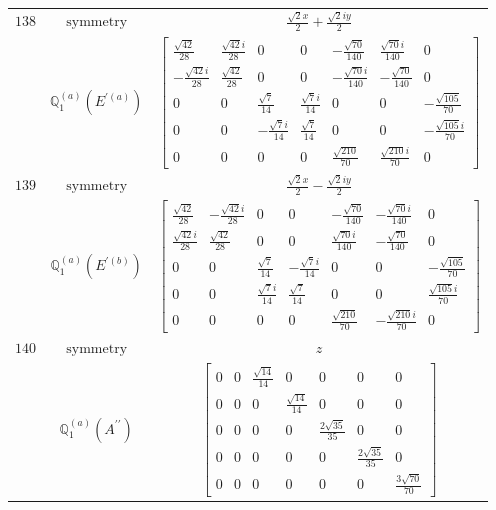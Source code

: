 \documentclass[fleqn,8pt,landscape]{jsarticle}
\begin{document}
\begin{longtable}{ccc}
$ 138 $ & $ \text{symmetry} $ & $ \frac{\sqrt{2} x}{2} + \frac{\sqrt{2} i y}{2} $ \\
$  $ & $ \mathbb{Q}_{1}^{(a)}(E^{\prime(a)}) $ & $ \begin{bmatrix} \frac{\sqrt{42}}{28} & \frac{\sqrt{42} i}{28} & 0 & 0 & - \frac{\sqrt{70}}{140} & \frac{\sqrt{70} i}{140} & 0 \\ - \frac{\sqrt{42} i}{28} & \frac{\sqrt{42}}{28} & 0 & 0 & - \frac{\sqrt{70} i}{140} & - \frac{\sqrt{70}}{140} & 0 \\ 0 & 0 & \frac{\sqrt{7}}{14} & \frac{\sqrt{7} i}{14} & 0 & 0 & - \frac{\sqrt{105}}{70} \\ 0 & 0 & - \frac{\sqrt{7} i}{14} & \frac{\sqrt{7}}{14} & 0 & 0 & - \frac{\sqrt{105} i}{70} \\ 0 & 0 & 0 & 0 & \frac{\sqrt{210}}{70} & \frac{\sqrt{210} i}{70} & 0 \end{bmatrix} $ \\ \hline
$ 139 $ & $ \text{symmetry} $ & $ \frac{\sqrt{2} x}{2} - \frac{\sqrt{2} i y}{2} $ \\
$  $ & $ \mathbb{Q}_{1}^{(a)}(E^{\prime(b)}) $ & $ \begin{bmatrix} \frac{\sqrt{42}}{28} & - \frac{\sqrt{42} i}{28} & 0 & 0 & - \frac{\sqrt{70}}{140} & - \frac{\sqrt{70} i}{140} & 0 \\ \frac{\sqrt{42} i}{28} & \frac{\sqrt{42}}{28} & 0 & 0 & \frac{\sqrt{70} i}{140} & - \frac{\sqrt{70}}{140} & 0 \\ 0 & 0 & \frac{\sqrt{7}}{14} & - \frac{\sqrt{7} i}{14} & 0 & 0 & - \frac{\sqrt{105}}{70} \\ 0 & 0 & \frac{\sqrt{7} i}{14} & \frac{\sqrt{7}}{14} & 0 & 0 & \frac{\sqrt{105} i}{70} \\ 0 & 0 & 0 & 0 & \frac{\sqrt{210}}{70} & - \frac{\sqrt{210} i}{70} & 0 \end{bmatrix} $ \\ \hline
$ 140 $ & $ \text{symmetry} $ & $ z $ \\
$  $ & $ \mathbb{Q}_{1}^{(a)}(A^{\prime\prime}) $ & $ \begin{bmatrix} 0 & 0 & \frac{\sqrt{14}}{14} & 0 & 0 & 0 & 0 \\ 0 & 0 & 0 & \frac{\sqrt{14}}{14} & 0 & 0 & 0 \\ 0 & 0 & 0 & 0 & \frac{2 \sqrt{35}}{35} & 0 & 0 \\ 0 & 0 & 0 & 0 & 0 & \frac{2 \sqrt{35}}{35} & 0 \\ 0 & 0 & 0 & 0 & 0 & 0 & \frac{3 \sqrt{70}}{70} \end{bmatrix} $ \\ \hline

\end{longtable}
\end{document}
